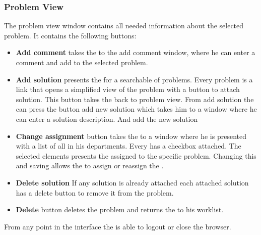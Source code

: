 \subsubsection{Problem View}
The problem view window contains all needed information about the selected problem. It contains the following buttons: 
\begin{itemize}
\item \textbf{Add comment}  takes the \astaff{} to the add comment window, where he can enter a comment and add to the selected problem. 

\item \textbf{Add solution} presents the \astaff{} for a searchable of problems. Every problem is a link that opens a simplified view of the problem with a button to attach solution. This button takes the \astaff{} back to problem view. From add solution the \astaff{} can press the button add new solution which takes him to a window where he can enter a solution description.
And add the new solution 

\item \textbf{Change assignment} button takes the \astaff{} to a window where he is presented with a list of all \staff{} in his departments. Every \staff{} has a checkbox attached. The selected elements presents the \staff{} assigned to the specific problem. Changing this and saving allows the \astaff{} to assign or reassign the \astaff{}. 

\item \textbf{Delete solution} If any solution is already attached each attached solution has a delete button to remove it from the problem. 

\item \textbf{Delete} button deletes the problem and returns the \staff{} to his worklist.

\end{itemize}
From any point in the interface the \astaff{} is able to logout or close the browser. 






